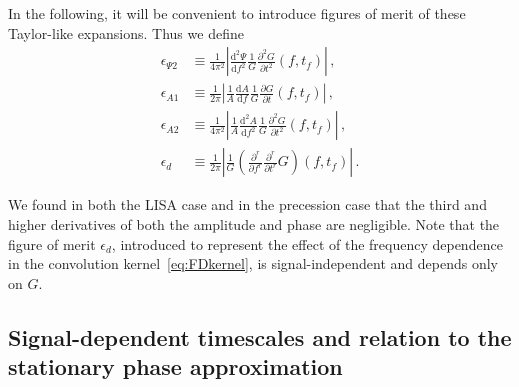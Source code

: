 \documentclass[aps,showpacs,%
prd,superscriptaddress,nofootinbib]{revtex4}
\newcommand\ud{{\mathrm{d}}}
\newcommand{\tf}{t_{f}}
\begin{document}
In the following, it will be convenient to introduce figures of merit of these Taylor-like expansions. Thus we define
\begin{subequations}\label{eq:deffom}
\begin{align}
	\epsilon_{\Psi 2} &\equiv \frac{1}{4\pi^{2}} \left| \frac{\ud^{2} \Psi}{\ud f^{2}} \frac{1}{G} \frac{\partial^{2} G}{\partial t^{2}}(f, \tf) \right| \,, \\
	\epsilon_{A 1} &\equiv \frac{1}{2\pi} \left| \frac{1}{A}\frac{\ud A}{\ud f} \frac{1}{G} \frac{\partial G}{\partial t}(f, \tf) \right| \,, \\
	\epsilon_{A 2} &\equiv \frac{1}{4\pi^{2}} \left| \frac{1}{A}\frac{\ud^{2} A}{\ud f^{2}} \frac{1}{G} \frac{\partial^{2} G}{\partial t^{2}}(f, \tf) \right| \,, \\
	\epsilon_{d} &\equiv \frac{1}{2\pi} \left| \frac{1}{G} \left( \frac{\partial^{r} }{\partial f^{r}} \frac{\partial^{r} }{\partial t^{r}} G \right)(f, \tf) \right| \,.
\end{align}
\end{subequations}

We found in both the LISA case and in the precession case that the third and higher derivatives of both the amplitude and phase are negligible. Note that the figure of merit $\epsilon_{d}$, introduced to represent the effect of the frequency dependence in the convolution kernel~\eqref{eq:FDkernel}, is signal-independent and depends only on $G$.


\subsection{Signal-dependent timescales and relation to the stationary phase approximation}
\label{subsec:linkSPA}
\end{document}
